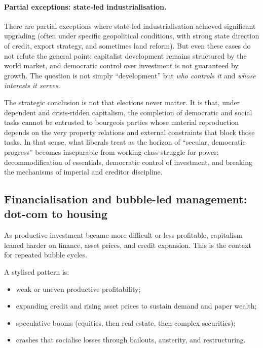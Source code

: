\paragraph{Partial exceptions: state-led industrialisation.}
There are partial exceptions where state-led industrialisation achieved significant upgrading (often under
specific geopolitical conditions, with strong state direction of credit, export strategy, and sometimes land
reform). But even these cases do not refute the general point: capitalist development remains structured by the
world market, and democratic control over investment is not guaranteed by growth. The question is not simply
``development'' but \emph{who controls it} and \emph{whose interests it serves}.

The strategic conclusion is not that elections never matter. It is that, under dependent and crisis-ridden
capitalism, the completion of democratic and social tasks cannot be entrusted to bourgeois parties whose
material reproduction depends on the very property relations and external constraints that block those tasks.
In that sense, what liberals treat as the horizon of ``secular, democratic progress'' becomes inseparable from
working-class struggle for power: decommodification of essentials, democratic control of investment, and
breaking the mechanisms of imperial and creditor discipline.\cite{PeetUnholyTrinity,HarveyNeoliberalism}


\subsection{Financialisation and bubble-led management: dot-com to housing}
\label{subsec:dotcom-2008}

As productive investment became more difficult or less profitable, capitalism leaned harder on finance, asset prices,
and credit expansion. This is the context for repeated bubble cycles.

A stylised pattern is:
\begin{itemize}[leftmargin=1.5em]
  \item weak or uneven productive profitability;
  \item expanding credit and rising asset prices to sustain demand and paper wealth;
  \item speculative booms (equities, then real estate, then complex securities);
  \item crashes that socialise losses through bailouts, austerity, and restructuring.
\end{itemize}

